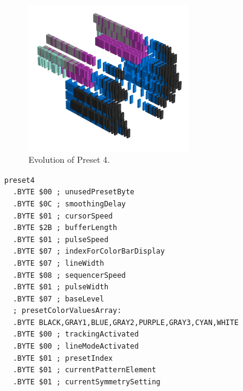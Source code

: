 \begin{minipage}[b]{0.48\linewidth}
\begin{figure}[H]                                                          
  \centering                                                             
  \begin{adjustbox}{width=7cm,center}                                   
  \includegraphics[width=7cm]{src/presets/pattern4-45.png}%
  \end{adjustbox}                                                        
\caption{Evolution of Preset 4.}                                           
\end{figure}                                                               
\end{minipage}
\hspace{0.1cm}
\begin{minipage}[b]{0.48\linewidth}                            
                                                                           
\begin{lstlisting}[basicstyle=\ttfamily\scriptsize,caption=Data structure for Preset 4.]
preset4
  .BYTE $00 ; unusedPresetByte
  .BYTE $0C ; smoothingDelay
  .BYTE $01 ; cursorSpeed
  .BYTE $2B ; bufferLength
  .BYTE $01 ; pulseSpeed
  .BYTE $07 ; indexForColorBarDisplay
  .BYTE $07 ; lineWidth
  .BYTE $08 ; sequencerSpeed
  .BYTE $01 ; pulseWidth
  .BYTE $07 ; baseLevel
  ; presetColorValuesArray: 
  .BYTE BLACK,GRAY1,BLUE,GRAY2,PURPLE,GRAY3,CYAN,WHITE
  .BYTE $00 ; trackingActivated
  .BYTE $00 ; lineModeActivated
  .BYTE $01 ; presetIndex
  .BYTE $01 ; currentPatternElement
  .BYTE $01 ; currentSymmetrySetting
\end{lstlisting}
\end{minipage}
\clearpage

